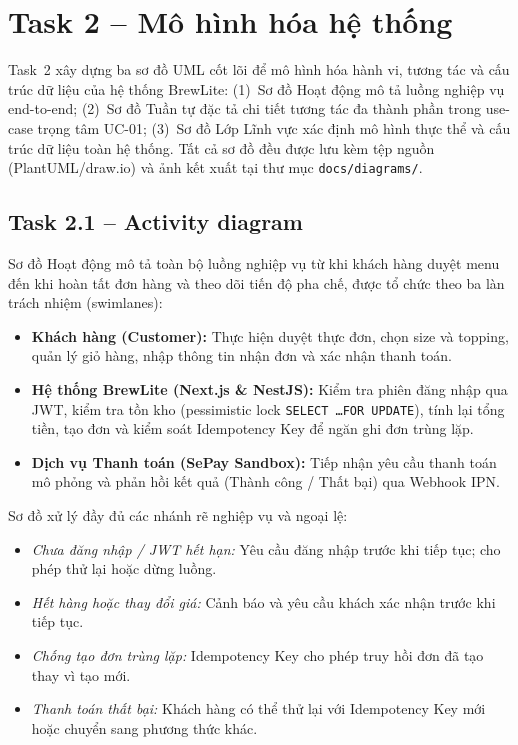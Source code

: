 \documentclass[a4paper]{article}
\begin{document}
\leavevmode\par
\vspace{8mm}

\section{Task 2 – Mô hình hóa hệ thống}

Task~2 xây dựng ba sơ đồ UML cốt lõi để mô hình hóa hành vi, tương tác và cấu trúc dữ liệu của hệ thống BrewLite:
(1)~Sơ đồ Hoạt động mô tả luồng nghiệp vụ end-to-end;
(2)~Sơ đồ Tuần tự đặc tả chi tiết tương tác đa thành phần trong use-case trọng tâm UC-01;
(3)~Sơ đồ Lớp Lĩnh vực xác định mô hình thực thể và cấu trúc dữ liệu toàn hệ thống.
Tất cả sơ đồ đều được lưu kèm tệp nguồn (PlantUML/draw.io) và ảnh kết xuất tại thư mục \texttt{docs/diagrams/}.

\subsection{Task 2.1 – Activity diagram}

Sơ đồ Hoạt động mô tả toàn bộ luồng nghiệp vụ từ khi khách hàng duyệt menu đến khi hoàn tất đơn hàng và theo dõi tiến độ pha chế, được tổ chức theo ba làn trách nhiệm (swimlanes):

\begin{itemize}
    \item \textbf{Khách hàng (Customer):} Thực hiện duyệt thực đơn, chọn size và topping, quản lý giỏ hàng, nhập thông tin nhận đơn và xác nhận thanh toán.
    \item \textbf{Hệ thống BrewLite (Next.js \& NestJS):} Kiểm tra phiên đăng nhập qua JWT, kiểm tra tồn kho (pessimistic lock \texttt{SELECT \dots FOR UPDATE}), tính lại tổng tiền, tạo đơn và kiểm soát Idempotency Key để ngăn ghi đơn trùng lặp.
    \item \textbf{Dịch vụ Thanh toán (SePay Sandbox):} Tiếp nhận yêu cầu thanh toán mô phỏng và phản hồi kết quả (Thành công / Thất bại) qua Webhook IPN.
\end{itemize}

Sơ đồ xử lý đầy đủ các nhánh rẽ nghiệp vụ và ngoại lệ:
\begin{itemize}
    \item \textit{Chưa đăng nhập / JWT hết hạn:} Yêu cầu đăng nhập trước khi tiếp tục; cho phép thử lại hoặc dừng luồng.
    \item \textit{Hết hàng hoặc thay đổi giá:} Cảnh báo và yêu cầu khách xác nhận trước khi tiếp tục.
    \item \textit{Chống tạo đơn trùng lặp:} Idempotency Key cho phép truy hồi đơn đã tạo thay vì tạo mới.
    \item \textit{Thanh toán thất bại:} Khách hàng có thể thử lại với Idempotency Key mới hoặc chuyển sang phương thức khác.
\end{itemize}
\end{document}
